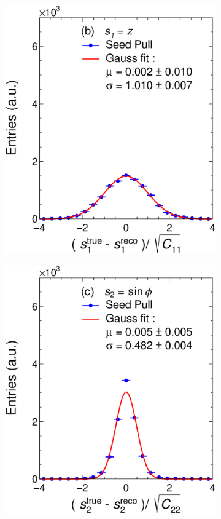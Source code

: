 \begin{figure}[t]
\begin{subfigure}{0.32\textwidth}
         \includegraphics[width=\textwidth]{figures/ch4-KF_NDGArLite/MC/ILRM+KF/UnitSeed_p1.eps}
         \caption{}
         \label{fig:resp1Seed_GArLite_ILRM+KF}
     \end{subfigure}
    \begin{subfigure}{0.32\textwidth}
         \centering
         \includegraphics[width=\textwidth]{figures/ch4-KF_NDGArLite/MC/ILRM+KF/UnitSeed_p2.eps}

\end{subfigure}
\end{figure}
